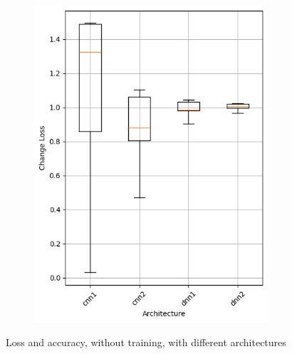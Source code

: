 \begin{figure}
\begin{subfigure}{0.5\textwidth}
        \includegraphics[width=0.95\textwidth]{plots/Architecture_NotTrained_loss.png}
    \end{subfigure}
    \caption{Loss and accuracy, without training, with different architectures}
    \label{fig:architecture-notraining}
\end{figure}
